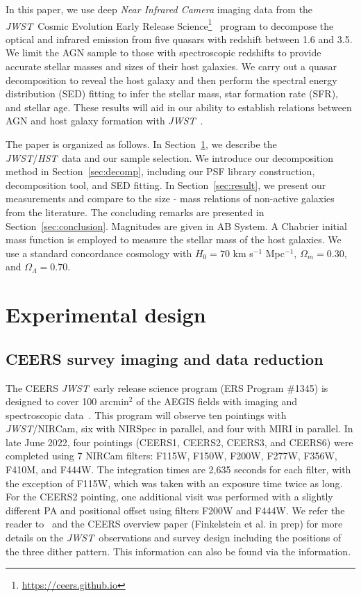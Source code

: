 \documentclass[twocolumn,]{aastex631}
\newcommand{\hst}{{\it HST}}
\newcommand{\jwst}{{\it JWST}}
\begin{document}
In this paper, we use deep \textit{Near Infrared Camera} \citep[NIRCam,][]{Rieke05} imaging data from the \jwst\ Cosmic Evolution Early Release Science\footnote{\url{https://ceers.github.io}}~\citep[CEERS,][]{CEERS} program to decompose the optical and infrared emission from five quasars with redshift between 1.6 and 3.5. We limit the AGN sample to those with spectroscopic redshifts to provide accurate stellar masses and sizes of their host galaxies. We carry out a quasar decomposition to reveal the host galaxy and then perform the spectral energy distribution (SED) fitting to infer the stellar mass, star formation rate (SFR), and stellar age. These results will aid in our ability to establish relations between AGN and host galaxy formation with \jwst\ \citep{Kocevski2022}.

The paper is organized as follows. In Section~\ref{sec:design}, we describe the \jwst/\hst\ data and our sample selection. We introduce our decomposition method in Section~\ref{sec:decomp}, including our PSF library construction, decomposition tool, and SED fitting. In Section~\ref{sec:result}, we present our measurements and compare to the size - mass relations of non-active galaxies from the literature. The concluding remarks are presented in Section~\ref{sec:conclusion}. Magnitudes are given in AB System. A Chabrier initial mass function is employed to measure the stellar mass of the host galaxies. We use a standard concordance cosmology with $H_0= 70$ km s$^{-1}$ Mpc$^{-1}$, $\Omega{_m} = 0.30$, and $\Omega{_\Lambda} = 0.70$.


\section{Experimental design} \label{sec:design}

\subsection{CEERS survey imaging and data reduction}
The CEERS \jwst\ early release science program (ERS Program \#1345) is designed to cover 100 arcmin$^2$ of the AEGIS fields with imaging and spectroscopic data~\citep{CEERS}. This program will observe ten pointings with \jwst/NIRCam, six with NIRSpec in parallel, and four with MIRI in parallel. In late June 2022, four pointings  (CEERS1, CEERS2, CEERS3, and CEERS6) were completed using 7 NIRCam filters: F115W, F150W, F200W, F277W, F356W, F410M, and F444W. The integration times are 2,635 seconds for each filter, with the exception of F115W, which was taken with an exposure time twice as long. For the CEERS2 pointing, one additional visit was performed with a slightly different PA and positional offset using filters F200W and F444W. We refer the reader to~\citet{Finkelstein2022} and the CEERS overview paper (Finkelstein et al. in prep) for more details on the \jwst\ observations and survey design including the positions of the three dither pattern. This information can also be found via the information.
\end{document}
